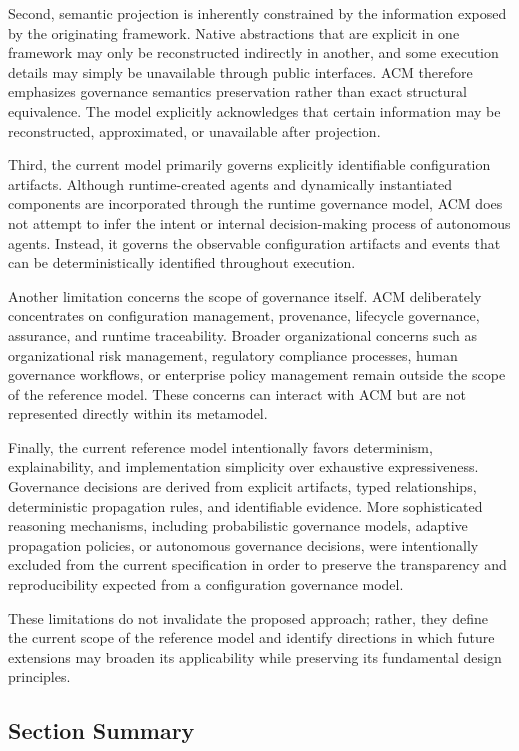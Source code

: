 \documentclass[10pt]{article}
\begin{document}
Second, semantic projection is inherently constrained by the information exposed by the originating framework. Native abstractions that are explicit in one framework may only be reconstructed indirectly in another, and some execution details may simply be unavailable through public interfaces. ACM therefore emphasizes governance semantics preservation rather than exact structural equivalence. The model explicitly acknowledges that certain information may be reconstructed, approximated, or unavailable after projection.

Third, the current model primarily governs explicitly identifiable configuration artifacts. Although runtime-created agents and dynamically instantiated components are incorporated through the runtime governance model, ACM does not attempt to infer the intent or internal decision-making process of autonomous agents. Instead, it governs the observable configuration artifacts and events that can be deterministically identified throughout execution.

Another limitation concerns the scope of governance itself. ACM deliberately concentrates on configuration management, provenance, lifecycle governance, assurance, and runtime traceability. Broader organizational concerns such as organizational risk management, regulatory compliance processes, human governance workflows, or enterprise policy management remain outside the scope of the reference model. These concerns can interact with ACM but are not represented directly within its metamodel.

Finally, the current reference model intentionally favors determinism, explainability, and implementation simplicity over exhaustive expressiveness. Governance decisions are derived from explicit artifacts, typed relationships, deterministic propagation rules, and identifiable evidence. More sophisticated reasoning mechanisms, including probabilistic governance models, adaptive propagation policies, or autonomous governance decisions, were intentionally excluded from the current specification in order to preserve the transparency and reproducibility expected from a configuration governance model.

These limitations do not invalidate the proposed approach; rather, they define the current scope of the reference model and identify directions in which future extensions may broaden its applicability while preserving its fundamental design principles.

\subsection{Section Summary}
\end{document}
